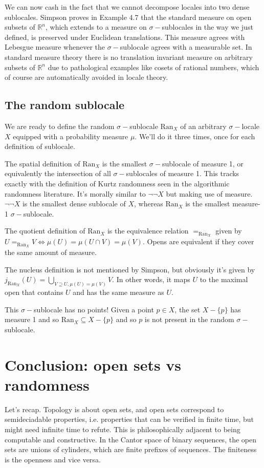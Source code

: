 \documentclass[12pt]{extarticle}
\newcommand{\ran}{\ensuremath{\mathrm{Ran}}}
\newcommand{\sig}{\ensuremath{\sigma-}}
\begin{document}
We can now cash in the fact that we cannot decompose locales into two dense sublocales. Simpson \cite{simpson} proves in Example 4.7 that the standard measure on open subsets of $\mathbb{R}^n$, which extends to a measure on \sig sublocales in the way we just defined, is preserved under Euclidean translations. This measure agrees with Lebesgue measure whenever the \sig sublocale agrees with a measurable set. In standard measure theory there is no translation invariant measure on arbitrary subsets of $\mathbb{R}^n$ due to pathological examples like cosets of rational numbers, which of course are automatically avoided in locale theory. 

\subsection{The random sublocale}
We are ready to define the random \sig sublocale $\ran_X$ of an arbitrary \sig locale $X$ equipped with a probability measure $\mu$. We'll do it three times, once for each definition of sublocale.

The spatial definition of $\ran_X$ is the smallest \sig sublocale of measure 1, or equivalently the intersection of all \sig sublocales of measure 1. This tracks exactly with the definition of Kurtz randomness seen in the algorithmic randomness literature. It's morally similar to $\neg\neg X$ but making use of measure. $\neg\neg X$ is the smallest dense sublocale of $X$, whereas $\ran_X$ is the smallest measure-1 \sig sublocale.

The quotient definition of $\ran_X$ is the equivalence relation $=_{\ran_X}$ given by $U=_{\ran_X} V \iff \mu(U)=\mu(U\cap V)=\mu(V)$. Opens are equivalent if they cover the same amount of measure.

The nucleus definition is not mentioned by Simpson, but obviously it's given by $j_{\ran_X}(U) = \bigcup_{V\supseteq U, \mu(U)=\mu(V)}V.$ In other words, it maps $U$ to the maximal open that contains $U$ and has the same measure as $U$.

This \sig sublocale has no points! Given a point $p\in X$, the set $X-\{p\}$ has measure 1 and so $\ran_X\subseteq X-\{p\}$ and so $p$ is not present in the random \sig sublocale.

\section{Conclusion: open sets vs randomness}
Let's recap. Topology is about open sets, and open sets correspond to semideciadable properties, i.e. properties that can be verified in finite time, but might need infinite time to refute. This is philosophically adjacent to being computable and constructive. In the Cantor space of binary sequences, the open sets are unions of cylinders, which are finite prefixes of sequences. The finiteness is the openness and vice versa.
\end{document}
